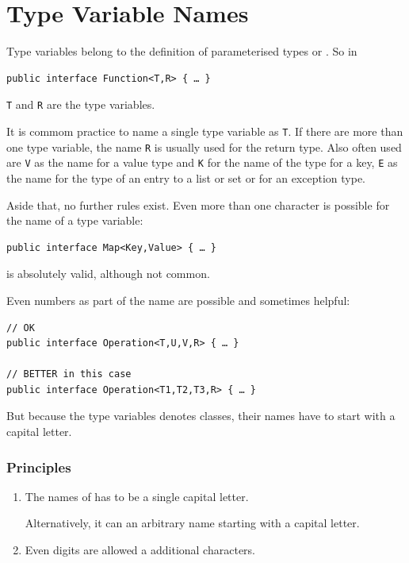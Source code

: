 \section{Type Variable Names}\label{sec:TypeVariables}
Type variables \autocite{ORACLE_DOC_LANGUAGE_SPECIFICATION:TypeVariables} belong to the definition of parameterised types \autocite{ORACLE_DOC_LANGUAGE_SPECIFICATION:ParameterizedTypes} or . So in
\begin{lstlisting}
public interface Function<T,R> { … }
\end{lstlisting}
\lstinline|T| and \lstinline|R| are the type variables.

It is commom practice to name a single type variable as \lstinline|T|. If there are more than one type variable, the name \lstinline|R| is usually used for the return type. Also often used are \lstinline|V| as the name for a value type and \lstinline|K| for the name of the type for a key, \lstinline|E| as the name for the type of an entry to a list or set or for an exception type.

Aside that, no further rules exist. Even more than one character is possible for the name of a type variable: 
\begin{lstlisting}
public interface Map<Key,Value> { … }
\end{lstlisting}
is absolutely valid, although not common.

Even numbers as part of the name are possible and sometimes helpful:
\begin{lstlisting}
// OK
public interface Operation<T,U,V,R> { … }

// BETTER in this case
public interface Operation<T1,T2,T3,R> { … }
\end{lstlisting}
 

But because the type variables denotes classes, their names have to start with a capital letter.

\subsubsection{Principles}
\begin{enumerate}[label=P\arabic*.]
	\item{The names of has to be a single capital letter.
	
	Alternatively, it can an arbitrary name starting with a capital letter.}
	
	\item{Even digits are allowed a additional characters.}
\end{enumerate}

